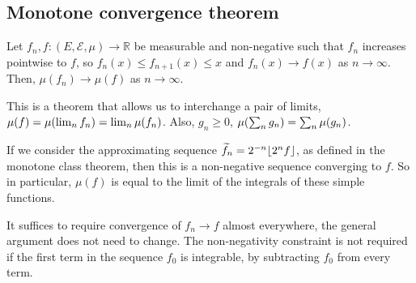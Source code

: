 \subsection{Monotone convergence theorem}
\begin{theorem}
	Let \( f_n, f \colon (E,\mathcal E,\mu) \to \mathbb R \) be measurable and non-negative such that \( f_n \) increases pointwise to \( f \), so \( f_n(x) \leq f_{n+1}(x) \leq x \) and \( f_n(x) \to f(x) \) as \( n \to \infty \).
	Then, \( \mu(f_n) \to \mu(f) \) as \( n \to \infty \).
\end{theorem}
\begin{remark}
	This is a theorem that allows us to interchange a pair of limits, \( \mu(f) = \mu\qty(\lim_n f_n) = \lim_n \mu(f_n) \).
	Also, \( g_n \geq 0 \), \( \mu\qty(\sum_n g_n) = \sum_n \mu(g_n) \).

	If we consider the approximating sequence \( \widetilde f_n = 2^{-n} \lfloor2^n f\rfloor \), as defined in the monotone class theorem, then this is a non-negative sequence converging to \( f \).
	So in particular, \( \mu(f) \) is equal to the limit of the integrals of these simple functions.

	It suffices to require convergence of \( f_n \to f \) almost everywhere, the general argument does not need to change.
	The non-negativity constraint is not required if the first term in the sequence \( f_0 \) is integrable, by subtracting \( f_0 \) from every term.
\end{remark}
